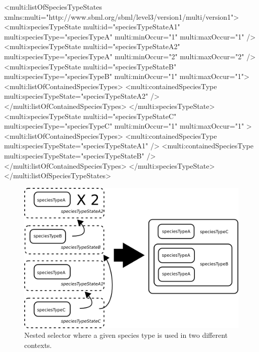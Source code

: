 \begin{example}
<multi:listOfSpeciesTypeStates xmlns:multi="http://www.sbml.org/sbml/level3/version1/multi/version1">
  <multi:speciesTypeState multi:id="speciesTypeStateA1" multi:speciesType="speciesTypeA" 
                          multi:minOccur="1" multi:maxOccur="1" />
  <multi:speciesTypeState multi:id="speciesTypeStateA2" multi:speciesType="speciesTypeA"
                          multi:minOccur="2" multi:maxOccur="2" />
  <multi:speciesTypeState multi:id="speciesTypeStateB" multi:speciesType="speciesTypeB"
                          multi:minOccur="1" multi:maxOccur="1">
    <multi:listOfContainedSpeciesTypes>
      <multi:containedSpeciesType multi:speciesTypeState="speciesTypeStateA2" />
    </multi:listOfContainedSpeciesTypes>
  </multi:speciesTypeState>
  <multi:speciesTypeState multi:id="speciesTypeStateC" multi:speciesType="speciesTypeC"
                          multi:minOccur="1" multi:maxOccur="1" >
    <multi:listOfContainedSpeciesTypes>
      <multi:containedSpeciesType multi:speciesTypeState="speciesTypeStateA1" />
      <multi:containedSpeciesType multi:speciesTypeState="speciesTypeStateB" />
    </multi:listOfContainedSpeciesTypes>
  </multi:speciesTypeState>
</multi:listOfSpeciesTypeStates>
\end{example}

\begin{figure}[H]
\begin{center}
\includegraphics[scale=0.7]{figs/pngs/ex_sts_multiple.png} 
\caption{Nested selector where a given species type is used in two different contexts.}
\label{fig:ex_sts_multiple}
\end{center}
\end{figure}

